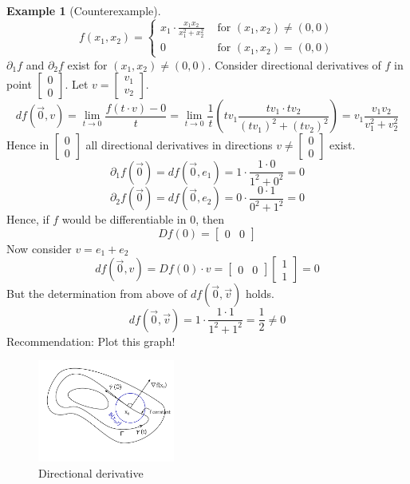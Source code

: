 \documentclass[a4paper,landscape,twocolumn]{article}
\theoremstyle{definition}
\newtheorem{ex}{Example}
\begin{document}
\begin{ex}[Counterexample]
  \[ f(x_1, x_2) = \begin{cases}
    x_1 \cdot \frac{x_1 x_2}{x_1^2 + x_2^2} & \text{ for } (x_1, x_2) \neq (0, 0) \\
    0                                     & \text{ for } (x_1, x_2) = (0, 0)
  \end{cases} \]
  $\partial_1 f$ and $\partial_2 f$ exist for $(x_1, x_2) \neq (0, 0)$.
  Consider directional derivatives of $f$ in point $\begin{bmatrix} 0 \\ 0 \end{bmatrix}$.
  Let $v = \begin{bmatrix} v_1 \\ v_2 \end{bmatrix}$.
  \[
  df(\vec{0}, v) = \lim_{t\to 0} \frac{f(t \cdot v) - 0}{t}
  = \lim_{t\to 0} \frac1{t} \left(tv_1 \frac{tv_1 \cdot tv_2}{(tv_1)^2 + (tv_2)^2}\right)
  = v_1 \frac{v_1 v_2}{v_1^2 + v_2^2}
  \]
  Hence in $\begin{bmatrix} 0 \\ 0 \end{bmatrix}$ all directional derivatives
  in directions $v \neq \begin{bmatrix} 0 \\ 0 \end{bmatrix}$ exist.
  \[ \partial_1 f(\vec{0}) = df(\vec{0}, e_1) = 1 \cdot \frac{1 \cdot 0}{1^2 + 0^2} = 0 \]
  \[ \partial_2 f(\vec{0}) = df(\vec{0}, e_2) = 0 \cdot \frac{0 \cdot 1}{0^2 + 1^2} = 0 \]
  Hence, if $f$ would be differentiable in $0$, then
  \[ Df(0) = \begin{bmatrix} 0 & 0 \end{bmatrix} \]
  Now consider $v = e_1 + e_2$
  \[ df(\vec{0}, v) = Df(0) \cdot v = \begin{bmatrix} 0 & 0 \end{bmatrix} \begin{bmatrix} 1 \\ 1 \end{bmatrix} = 0 \]
  But the determination from above of $df(\vec{0}, \vec{v})$ holds.
  \[ df(\vec{0}, \vec{v}) = 1 \cdot \frac{1 \cdot 1}{1^2 + 1^2} = \frac12 \neq 0 \]
  Recommendation: Plot this graph!
\end{ex}

\begin{figure}[h]
  \begin{center}
    \includegraphics[width=0.4\textwidth]{img/level_lines.pdf}
    \caption{Directional derivative}
  \end{center}
\end{figure}
\end{document}
